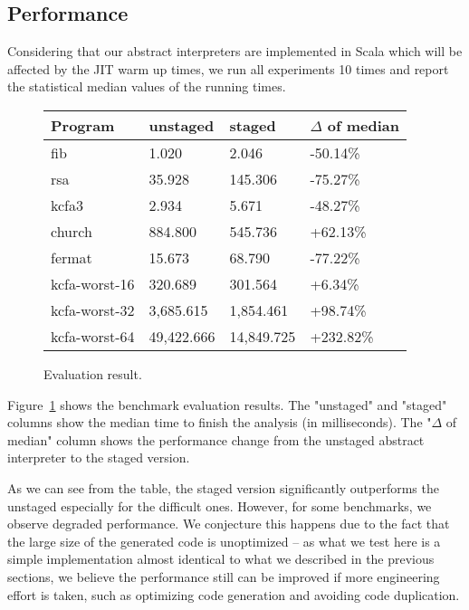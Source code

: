 \subsection{Performance}

Considering that our abstract interpreters are implemented in Scala which will be 
affected by the JIT warm up times, we run all experiments 10 times and report
the statistical median values of the running times.


\begin{figure}[h]
\begin{tabular}{@{}llll@{}}
\toprule
    Program            & unstaged   & staged     & $\Delta$ of median \\ \midrule
    fib                & 1.020      & 2.046      & -50.14\%          \\
    rsa                & 35.928     & 145.306    & -75.27\%          \\
    kcfa3              & 2.934      & 5.671      & -48.27\%          \\
    church             & 884.800    & 545.736    & +62.13\%          \\
    fermat             & 15.673     & 68.790     & -77.22\%          \\
    kcfa-worst-16      & 320.689    & 301.564    & +6.34\%           \\
    kcfa-worst-32      & 3,685.615  & 1,854.461  & +98.74\%          \\
    kcfa-worst-64      & 49,422.666 & 14,849.725 & +232.82\%         \\
    \bottomrule
\end{tabular}
\caption{Evaluation result.} \label{evaluation_result}
\end{figure}

Figure~\ref{evaluation_result} shows the benchmark evaluation results. The
"unstaged" and "staged" columns show the median time to finish the analysis (in
milliseconds). The "$\Delta$ of median" column shows the performance change from
the unstaged abstract interpreter to the staged version.

As we can see from the table, the staged version significantly outperforms the
unstaged especially for the difficult ones. However, for some benchmarks, we
observe degraded performance. We conjecture this happens due to the fact that
the large size of the generated code is unoptimized -- as what we test here is a
simple implementation almost identical to what we described in the previous
sections, we believe the performance still can be improved if more engineering
effort is taken, such as optimizing code generation and avoiding code
duplication.

